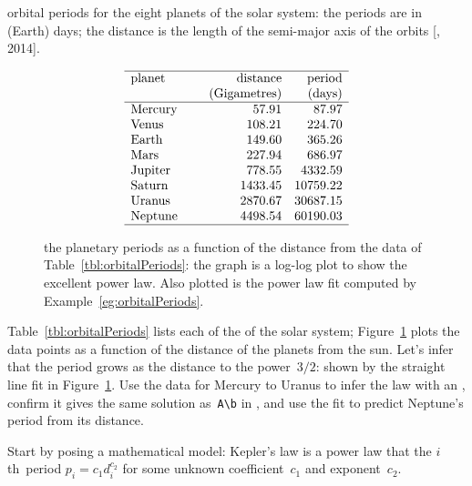 \begin{example} \label{eg:orbitalPeriods}
\begin{table}
\caption{orbital periods for the eight planets of the solar system: the periods are in (Earth) days; the distance is the length of the semi-major axis of the orbits [, 2014].}
\label{tbl:orbitalPeriods}
\begin{equation*}
\begin{array}{p{12ex}rr} \hline
planet&\text{distance}&\text{period}\\
&\text{(Gigametres)}&\text{(days)}\\\hline
Mercury& 57.91 & 87.97 \\
Venus& 108.21 & 224.70 \\
Earth& 149.60& 365.26\\
Mars& 227.94& 686.97\\
Jupiter& 778.55& 4332.59\\
Saturn& 1433.45& 10759.22\\
Uranus& 2870.67& 30687.15\\
Neptune& 4498.54& 60190.03\\\hline
\end{array}
\end{equation*}
\end{table}%
\begin{figure}
\centering

\caption{the planetary periods as a function of the distance from the data of Table~\ref{tbl:orbitalPeriods}: the graph is a log-log plot to show the excellent power law.  Also plotted is the power law fit computed by Example~\ref{eg:orbitalPeriods}.}
\label{fig:orbitalPeriods}
\end{figure}%
Table~\ref{tbl:orbitalPeriods} lists each  of the  of the solar system; Figure~\ref{fig:orbitalPeriods} plots the data points as a function of the distance of the planets from the sun.
Let's infer  that the period grows as the distance to the power~\(3/2\): shown by the straight line fit in Figure~\ref{fig:orbitalPeriods}.
Use the data for Mercury to Uranus to infer the law with an \svd, confirm it gives the same solution as~\verb|A\b| in \script, and use the fit to predict Neptune's period from its distance.
\begin{solution} 
Start by posing a mathematical model: Kepler's law is a power law that the \(i\)th~period \(p_i=c_1d_i^{c_2}\) for some unknown coefficient~\(c_1\) and exponent~\(c_2\).  

\end{solution}
\end{example}
